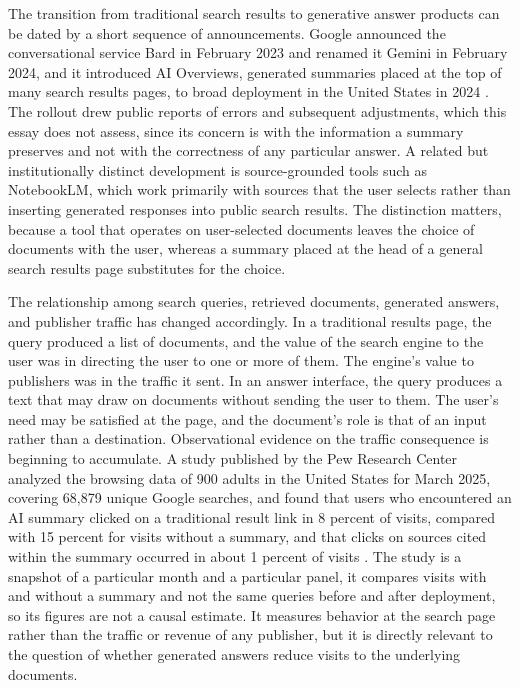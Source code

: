 \documentclass[11pt]{article}
\theoremstyle{remark}
\begin{document}
The transition from traditional search results to generative answer products can be dated by a short sequence of announcements. Google announced the conversational service Bard in February 2023 and renamed it Gemini in February 2024, and it introduced AI Overviews, generated summaries placed at the top of many search results pages, to broad deployment in the United States in 2024 \cite{pichai2023,hsiao2024,reid2024}. The rollout drew public reports of errors and subsequent adjustments, which this essay does not assess, since its concern is with the information a summary preserves and not with the correctness of any particular answer. A related but institutionally distinct development is source-grounded tools such as NotebookLM, which work primarily with sources that the user selects rather than inserting generated responses into public search results. The distinction matters, because a tool that operates on user-selected documents leaves the choice of documents with the user, whereas a summary placed at the head of a general search results page substitutes for the choice.

The relationship among search queries, retrieved documents, generated answers, and publisher traffic has changed accordingly. In a traditional results page, the query produced a list of documents, and the value of the search engine to the user was in directing the user to one or more of them. The engine's value to publishers was in the traffic it sent. In an answer interface, the query produces a text that may draw on documents without sending the user to them. The user's need may be satisfied at the page, and the document's role is that of an input rather than a destination. Observational evidence on the traffic consequence is beginning to accumulate. A study published by the Pew Research Center analyzed the browsing data of 900 adults in the United States for March 2025, covering 68,879 unique Google searches, and found that users who encountered an AI summary clicked on a traditional result link in 8 percent of visits, compared with 15 percent for visits without a summary, and that clicks on sources cited within the summary occurred in about 1 percent of visits \cite{pew2025}. The study is a snapshot of a particular month and a particular panel, it compares visits with and without a summary and not the same queries before and after deployment, so its figures are not a causal estimate. It measures behavior at the search page rather than the traffic or revenue of any publisher, but it is directly relevant to the question of whether generated answers reduce visits to the underlying documents.
\end{document}
